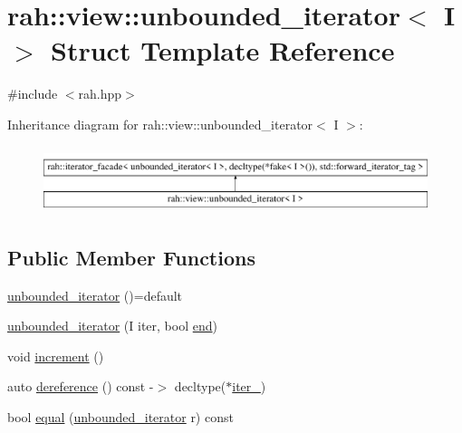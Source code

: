 \hypertarget{structrah_1_1view_1_1unbounded__iterator}{}\section{rah\+::view\+::unbounded\+\_\+iterator$<$ I $>$ Struct Template Reference}
\label{structrah_1_1view_1_1unbounded__iterator}


{\ttfamily \#include $<$rah.\+hpp$>$}

Inheritance diagram for rah\+::view\+::unbounded\+\_\+iterator$<$ I $>$\+:\begin{figure}[H]
\begin{center}
\leavevmode
\includegraphics[height=1.968366cm]{structrah_1_1view_1_1unbounded__iterator}
\end{center}
\end{figure}
\subsection*{Public Member Functions}
\begin{DoxyCompactItemize}
\item 
\mbox{\hyperlink{structrah_1_1view_1_1unbounded__iterator_aecc43db612ed5ad8e6002356feb92b48}{unbounded\+\_\+iterator}} ()=default
\item 
\mbox{\hyperlink{structrah_1_1view_1_1unbounded__iterator_a6043d431a0b2db6691397dd8029287b4}{unbounded\+\_\+iterator}} (I iter, bool \mbox{\hyperlink{namespacerah_aaddd1442cd76b96876e692cdefe7261d}{end}})
\item 
void \mbox{\hyperlink{structrah_1_1view_1_1unbounded__iterator_a903c96112b62831505ba8c7af80f6263}{increment}} ()
\item 
auto \mbox{\hyperlink{structrah_1_1view_1_1unbounded__iterator_a99189d6052f625642f8e00ff6e58a860}{dereference}} () const -\/$>$ decltype($\ast$\mbox{\hyperlink{structrah_1_1view_1_1unbounded__iterator_a50affaae71d4122b92014b11763f6672}{iter\+\_\+}})
\item 
bool \mbox{\hyperlink{structrah_1_1view_1_1unbounded__iterator_ae9234860041ae72e3b2667d8121fa224}{equal}} (\mbox{\hyperlink{structrah_1_1view_1_1unbounded__iterator}{unbounded\+\_\+iterator}} r) const
\end{DoxyCompactItemize}
